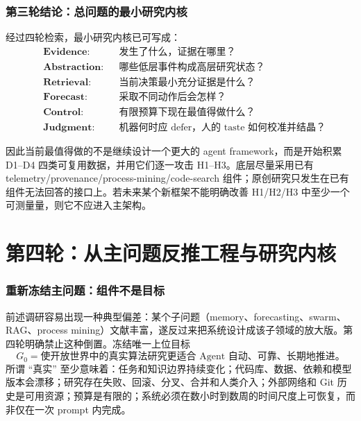 \documentclass[11pt,a4paper]{ctexart}
\begin{document}
\section{第三轮结论：总问题的最小研究内核}

经过四轮检索，最小研究内核已可写成：
\begin{equation}
\boxed{
\begin{aligned}
&\textbf{Evidence}: &&\text{发生了什么，证据在哪里？}\\
&\textbf{Abstraction}: &&\text{哪些低层事件构成高层研究状态？}\\
&\textbf{Retrieval}: &&\text{当前决策最小充分证据是什么？}\\
&\textbf{Forecast}: &&\text{采取不同动作后会怎样？}\\
&\textbf{Control}: &&\text{有限预算下现在最值得做什么？}\\
&\textbf{Judgment}: &&\text{机器何时应 defer，人的 taste 如何校准并结晶？}
\end{aligned}}
\end{equation}

因此当前最值得做的不是继续设计一个更大的 agent framework，而是开始积累 D1--D4 四类可复用数据，并用它们逐一攻击 H1--H3。底层尽量采用已有 telemetry/provenance/process-mining/code-search 组件；原创研究只发生在已有组件无法回答的接口上。若未来某个新框架不能明确改善 H1/H2/H3 中至少一个可测量量，则它不应进入主架构。



\part{第四轮：从主问题反推工程与研究内核}

\section{重新冻结主问题：组件不是目标}

前述调研容易出现一种典型偏差：某个子问题（memory、forecasting、swarm、RAG、process mining）文献丰富，遂反过来把系统设计成该子领域的放大版。第四轮明确禁止这种倒置。冻结唯一上位目标
\begin{equation}
\boxed{G_0=\text{使开放世界中的真实算法研究更适合 Agent 自动、可靠、长期地推进。}}
\end{equation}
所谓 ``真实'' 至少意味着：任务和知识边界持续变化；代码库、数据、依赖和模型版本会漂移；研究存在失败、回滚、分叉、合并和人类介入；外部网络和 Git 历史是可用资源；预算是有限的；系统必须在数小时到数周的时间尺度上可恢复，而非仅在一次 prompt 内完成。
\end{document}
